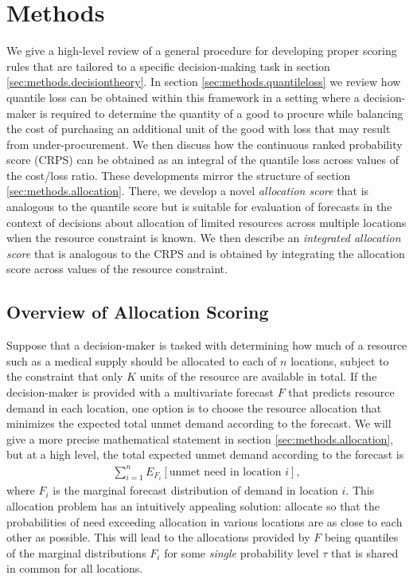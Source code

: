 \documentclass{article}
\begin{document}
\section{Methods}
\label{sec:methods}

We give a high-level review of a general procedure for developing proper scoring rules that are tailored to a specific decision-making task in section \ref{sec:methods.decisiontheory}. In section \ref{sec:methods.quantileloss} we review how quantile loss can be obtained within this framework in a setting where a decision-maker is required to determine the quantity of a good to procure while balancing the cost of purchasing an additional unit of the good with loss that may result from under-procurement. We then discuss how the continuous ranked probability score (CRPS) can be obtained as an integral of the quantile loss across values of the cost/loss ratio. These developments mirror the structure of section \ref{sec:methods.allocation}. There, we develop a novel \emph{allocation score} that is analogous to the quantile score but is suitable for evaluation of forecasts in the context of decisions about allocation of limited resources across multiple locations when the resource constraint is known. We then describe an \emph{integrated allocation score} that is analogous to the CRPS and is obtained by integrating the allocation score across values of the resource constraint.

\subsection{Overview of Allocation Scoring}

Suppose that a decision-maker is tasked with determining how much of a resource such as a medical supply should be allocated to each of $n$ locations, subject to the constraint that only $K$ units of the resource are available in total.
If the decision-maker is provided with a multivariate forecast $F$ that predicts resource demand in each location, one option is to choose the resource allocation that minimizes the expected total unmet demand according to the forecast.
We will give a more precise mathematical statement in section \ref{sec:methods.allocation}, but at a high level, the total expected unmet demand according to the forecast is
\begin{align}
\sum_{i=1}^n E_{F_i}[\text{unmet need in location $i$}],
\end{align}
where $F_i$ is the marginal forecast distribution of demand in location $i$.
This allocation problem has an intuitively appealing solution: allocate so that the probabilities of need exceeding allocation in various locations are as close to each other as possible.
This will lead to the allocations provided by $F$ being quantiles of the marginal distributions $F_i$ for some \emph{single} probability level $\tau$ that is shared in common for all locations.
\end{document}

